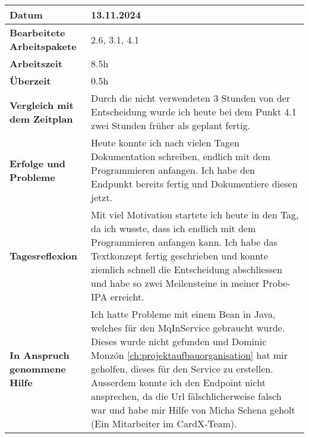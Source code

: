 \begin{longtable}{p{}|p{}}
	\hline
	\textbf{Datum}                       & 13.11.2024            \\
	\hline
	\textbf{Bearbeitete Arbeitspakete}   & 2.6, 3.1, 4.1                  \\
	\hline
	\textbf{Arbeitszeit}                 & 8.5h                                    \\
	\hline
	\textbf{Überzeit}                    & 0.5h                                    \\
	\hline
	\textbf{Vergleich mit dem Zeitplan}  & Durch die nicht verwendeten 3 Stunden von der Entscheidung wurde ich heute bei dem Punkt 4.1 zwei Stunden früher als geplant fertig. \\
	\hline
	\textbf{Erfolge und Probleme} & Heute konnte ich nach vielen Tagen Dokumentation schreiben, endlich mit dem Programmieren anfangen. Ich habe den Endpunkt bereits fertig und Dokumentiere diesen jetzt.
	\\
	\hline
	\textbf{Tagesreflexion} & Mit viel Motivation startete ich heute in den Tag, da ich wusste, dass ich endlich mit dem Programmieren anfangen kann. Ich habe das Textkonzept fertig geschrieben und konnte ziemlich schnell die Entscheidung abschliessen und habe so zwei Meilensteine in meiner Probe-IPA erreicht.
	\\
	\hline
	\textbf{In Anspruch genommene Hilfe} & Ich hatte Probleme mit einem Bean in Java, welches für den MqInService gebraucht wurde. Dieses wurde nicht gefunden und Dominic Monzón \ref{ch:projektaufbauorganisation} hat mir geholfen, dieses für den Service zu erstellen. Ausserdem konnte ich den Endpoint nicht ansprechen, da die Url fälschlicherweise falsch war und habe mir Hilfe von Micha Schena geholt (Ein Mitarbeiter im CardX-Team).                              \\
	\hline
\end{longtable}\label{tab:arbeitsprotokoll-13.11.2024}
\newpage

